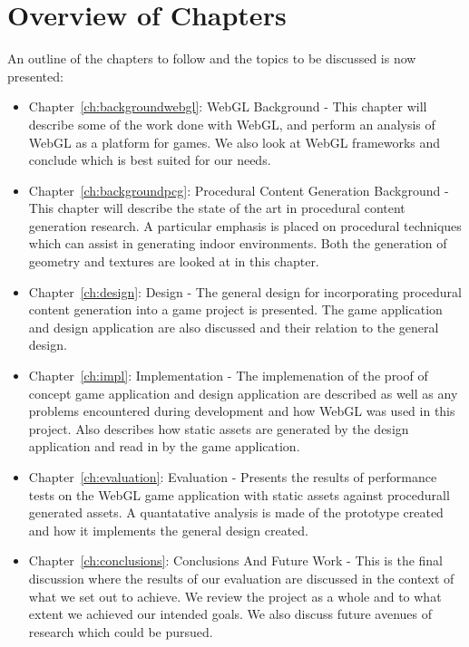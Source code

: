\section{Overview of Chapters}
An outline of the chapters to follow and the topics to be discussed is now presented:
\begin{itemize}
	\item Chapter~\ref{ch:backgroundwebgl}: WebGL Background - This chapter will describe some of the work done with WebGL, and perform an analysis of WebGL as a platform for games. We also look at WebGL frameworks and conclude which is best suited for our needs.
	\item Chapter~\ref{ch:backgroundpcg}: Procedural Content Generation Background - This chapter will describe the state of the art in procedural content generation research. A particular emphasis is placed on procedural techniques which can assist in generating indoor environments. Both the generation of geometry and textures are looked at in this chapter.
	\item Chapter~\ref{ch:design}: Design - The general design for incorporating procedural content generation into a game project is presented. The game application and design application are also discussed and their relation to the general design.
	\item Chapter~\ref{ch:impl}: Implementation - The implemenation of the proof of concept game application and design application are described as well as any problems encountered during development and how WebGL was used in this project. Also describes how static assets are generated by the design application and read in by the game application.
	\item Chapter~\ref{ch:evaluation}: Evaluation - Presents the results of performance tests on the WebGL game application with static assets against procedurall generated assets. A quantatative analysis is made of the prototype created and how it implements the general design created.
	\item Chapter~\ref{ch:conclusions}: Conclusions And Future Work - This is the final discussion where the results of our evaluation are discussed in the context of what we set out to achieve. We review the project as a whole and to what extent we achieved our intended goals. We also discuss future avenues of research which could be pursued.
\end{itemize}
